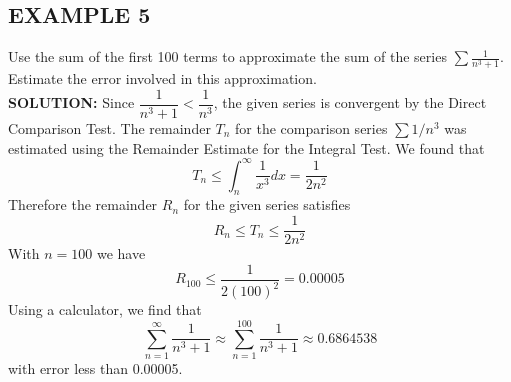 \documentclass{article}
\theoremstyle{mystyle}
\begin{document}
\subsection*{EXAMPLE 5}
Use the sum of the first 100 terms to approximate the sum of the series \( \sum \frac{1}{n^3 + 1} \). Estimate the error involved in this approximation.\\
\textbf{SOLUTION:}
Since $\dfrac{1}{n^3 + 1} < \dfrac{1}{n^3}$, the given series is convergent by the Direct Comparison Test. The remainder $T_n$ for the comparison series $\sum 1/n^3$ was estimated using the Remainder Estimate for the Integral Test. We found that
\[ T_n \le \int_n^\infty \frac{1}{x^3} dx = \frac{1}{2n^2} \]
Therefore the remainder $R_n$ for the given series satisfies
\[ R_n \le T_n \le \frac{1}{2n^2} \]
With $n=100$ we have
\[ R_{100} \le \frac{1}{2(100)^2} = 0.00005 \]
Using a calculator, we find that
\[ \sum_{n=1}^{\infty} \frac{1}{n^3 + 1} \approx \sum_{n=1}^{100} \frac{1}{n^3 + 1} \approx 0.6864538 \]
with error less than 0.00005.
\end{document}
